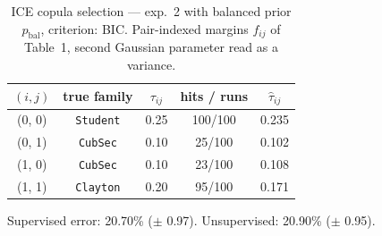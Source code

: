 \begin{table}[htbp]
  \centering
  \caption{ICE copula selection — exp.\ 2 with balanced prior $p_{\text{bal}}$, criterion: BIC. Pair-indexed margins $f_{ij}$ of Table~1, second Gaussian parameter read as a variance.}
  \label{tab:exp3-exp2_bal_p__bic}
  \begin{tabular}{ccccc}
    \toprule
    $(i, j)$ & true family & $\tau_{ij}$ & hits / runs & $\hat\tau_{ij}$ \\
    \midrule
    (0, 0) & \texttt{Student} & 0.25 & 100/100 & 0.235 \\
    (0, 1) & \texttt{CubSec} & 0.10 & 25/100 & 0.102 \\
    (1, 0) & \texttt{CubSec} & 0.10 & 23/100 & 0.108 \\
    (1, 1) & \texttt{Clayton} & 0.20 & 95/100 & 0.171 \\
    \bottomrule
  \end{tabular}
  \par\smallskip Supervised error: 20.70\% ($\pm$ 0.97). Unsupervised: 20.90\% ($\pm$ 0.95).
\end{table}
